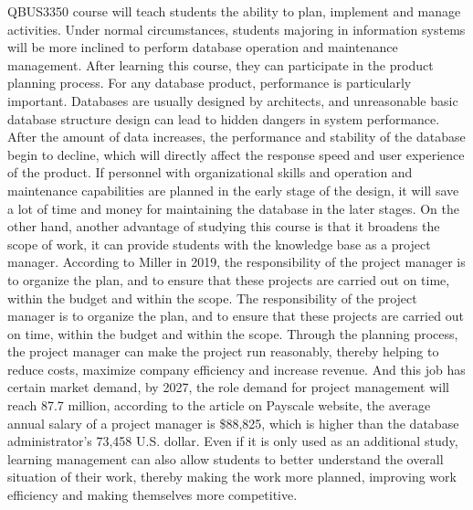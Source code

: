 \documentclass[12pt]{article}
\begin{document}
QBUS3350 course will teach students the ability to plan, implement and manage activities. Under normal circumstances, students majoring in information systems will be more inclined to perform database operation and maintenance management. After learning this course, they can participate in the product planning process. For any database product, performance is particularly important. Databases are usually designed by architects, and unreasonable basic database structure design can lead to hidden dangers in system performance. After the amount of data increases, the performance and stability of the database begin to decline, which will directly affect the response speed and user experience of the product. If personnel with organizational skills and operation and maintenance capabilities are planned in the early stage of the design, it will save a lot of time and money for maintaining the database in the later stages. On the other hand, another advantage of studying this course is that it broadens the scope of work, it can provide students with the knowledge base as a project manager. According to Miller in 2019, the responsibility of the project manager is to organize the plan, and to ensure that these projects are carried out on time, within the budget and within the scope. The responsibility of the project manager is to organize the plan, and to ensure that these projects are carried out on time, within the budget and within the scope. Through the planning process, the project manager can make the project run reasonably, thereby helping to reduce costs, maximize company efficiency and increase revenue. And this job has certain market demand, by 2027, the role demand for project management will reach 87.7 million, according to the article on Payscale website, the average annual salary of a project manager is \$88,825, which is higher than the database administrator's 73,458 U.S. dollar. Even if it is only used as an additional study, learning management can also allow students to better understand the overall situation of their work, thereby making the work more planned, improving work efficiency and making themselves more competitive.
\end{document}
